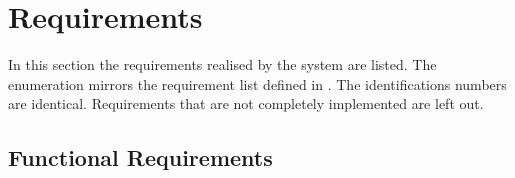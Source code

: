 \section{Requirements}
\label{requirements}



In this section the requirements realised by the system are listed. The enumeration mirrors the requirement list defined in \cite{Votes14}. The identifications numbers are identical. Requirements that are not completely implemented are left out.


\subsection{Functional Requirements}



